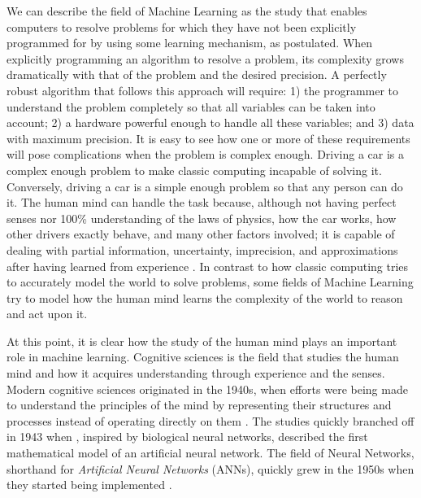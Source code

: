 We can describe the field of Machine Learning as the study that enables computers to resolve problems for which they have not been explicitly programmed for by using some learning mechanism, as \citet{Samuel1959} postulated.
When explicitly programming an algorithm to resolve a problem, its complexity grows dramatically with that of the problem and the desired precision.
A perfectly robust algorithm that follows this approach will require: 1) the programmer to understand the problem completely so that all variables can be taken into account; 2) a hardware powerful enough to handle all these variables; and 3) data with maximum precision.
It is easy to see how one or more of these requirements will pose complications when the problem is complex enough.
Driving a car is a complex enough problem to make classic computing incapable of solving it.
Conversely, driving a car is a simple enough problem so that any person can do it.
The human mind can handle the task because, although not having perfect senses nor 100\% understanding of the laws of physics, how the car works, how other drivers exactly behave, and many other factors involved; it is capable of dealing with partial information, uncertainty, imprecision, and approximations after having learned from experience \cite{Zadeh1994}.
In contrast to how classic computing tries to accurately model the world to solve problems, some fields of Machine Learning try to model how the human mind learns the complexity of the world to reason and act upon it.

At this point, it is clear how the study of the human mind plays an important role in machine learning.
Cognitive sciences is the field that studies the human mind and how it acquires understanding through experience and the senses.
Modern cognitive sciences originated in the 1940s, when efforts were being made to understand the principles of the mind by representing their structures and processes instead of operating directly on them \cite{Thagard2008}.
The studies quickly branched off in 1943 when \citet{McCulloch1943}, inspired by biological neural networks, described the first mathematical model of an artificial neural network.
The field of Neural Networks, shorthand for \emph{Artificial Neural Networks} (ANNs), quickly grew in the 1950s when they started being implemented \cite{Farley1954,Rosenblatt1958}.


